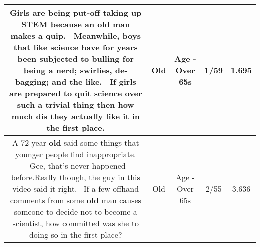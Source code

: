 \documentclass[11pt]{article}
\newlength\mylength
\begin{document}
\begin{center}
\begin{longtable}{|C{.65\mylength}|C{.30\mylength}|C{.12\mylength}|C{.12\mylength}|C{.12\mylength}|}
  \small Girls are being put-off taking up STEM because an \textbf{old} man makes a quip.  Meanwhile, boys that like science have for years been subjected to bulling for being a nerd; swirlies, de-bagging; and the like.  If girls are prepared to quit science over such a trivial thing then how much dis they actually like it in the first place.\normalsize   & Old & Age - Over 65s & 1/59 & 1.695 \\  \hline
  \small A 72-year \textbf{old} said some things that younger people find inappropriate.  Gee, that's never happened before.Really though, the guy in this video said it right.  If a few offhand comments from some \textbf{old} man causes someone to decide not to become a scientist, how committed was she to doing so in the first place?\normalsize   & Old & Age - Over 65s & 2/55 & 3.636 \\  \hline

\end{longtable}
\end{center}
\end{document}
